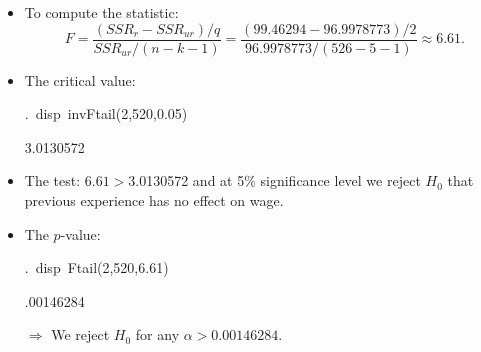 \documentclass[notes=show,compress,beamer]{beamer}
\begin{document}
\begin{frame}[squeeze]%


\begin{itemize}
\item To compute the statistic:%
\begin{equation*}
F=\frac{\left( SSR_{r}-SSR_{ur}\right) /q}{SSR_{ur}/\left( n-k-1\right) }=%
\frac{\left( 99.46294-96.9978773\right) /2}{96.9978773/\left( 526-5-1\right) 
}\approx 6.61.
\end{equation*}%
\pause%

\item The critical value:

\begin{semiverbatim}%
.\ disp\ invFtail(2,520,0.05)

3.0130572%
\end{semiverbatim}%
\pause%

\item The test: $6.61>$3.0130572 and at 5\% significance level we reject $%
H_{0}$ that previous experience has no effect on wage.%
\pause%

\item The $p$-value:

\begin{semiverbatim}%
.\ disp\ Ftail(2,520,6.61)

.00146284%
\end{semiverbatim}%
\pause%

$\Longrightarrow $ We reject $H_{0}$ for any $\alpha >0.00146284.$
\end{itemize}

\end{frame}%
\end{document}
